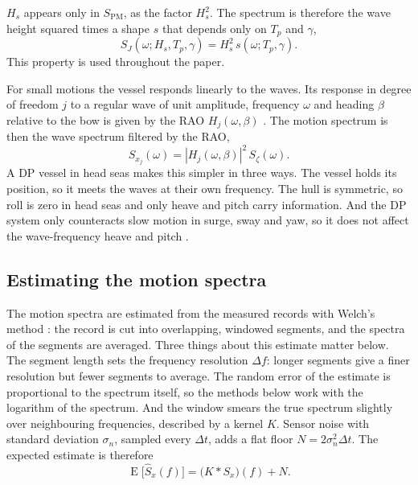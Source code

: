 \documentclass[10pt,a4paper,twocolumn,twoside]{article}
\newcommand{\Hs}{H_{s}}
\newcommand{\Tp}{T_{p}}
\begin{document}
$\Hs$ appears only in $S_{\mathrm{PM}}$, as the factor $\Hs^2$. The spectrum is therefore the wave
height squared times a shape $s$ that depends only on $\Tp$ and $\gamma$,
\begin{equation}
S_J(\omega; \Hs, \Tp, \gamma) = \Hs^2\, s(\omega; \Tp, \gamma).
\label{eq:hs_scaling}
\end{equation}
This property is used throughout the paper.

For small motions the vessel responds linearly to the waves. Its response in degree of freedom $j$
to a regular wave of unit amplitude, frequency $\omega$ and heading $\beta$ relative to the bow is
given by the RAO $H_j(\omega,\beta)$ \citep{faltinsen1990}. The motion spectrum is then the wave
spectrum filtered by the RAO,
\begin{equation}
S_{x_j}(\omega) = |H_j(\omega, \beta)|^2\, S_\zeta(\omega).
\label{eq:response}
\end{equation}
A DP vessel in head seas makes this simpler in three ways. The vessel holds its position, so it
meets the waves at their own frequency. The hull is symmetric, so roll is zero in head seas and
only heave and pitch carry information. And the DP system only counteracts slow motion in surge,
sway and yaw, so it does not affect the wave-frequency heave and pitch \citep{fossen2021}.

\subsection{Estimating the motion spectra}
\label{sec:theory_welch}

The motion spectra are estimated from the measured records with Welch's method
\citep{welch1967}: the record is cut into overlapping, windowed segments, and the spectra of the
segments are averaged. Three things about this estimate matter below. The segment length sets the
frequency resolution $\Delta f$: longer segments give a finer resolution but fewer segments to
average. The random error of the estimate is proportional to the spectrum itself, so the methods
below work with the logarithm of the spectrum. And the window smears the true spectrum slightly over
neighbouring frequencies, described by a kernel $K$. Sensor noise with standard deviation
$\sigma_n$, sampled every $\Delta t$, adds a flat floor $N = 2\sigma_n^2\Delta t$. The expected
estimate is therefore
\begin{equation}
\operatorname{E}\big[\hat S_x(f)\big] = \big(K * S_x\big)(f) + N.
\label{eq:welch}
\end{equation}
\end{document}
